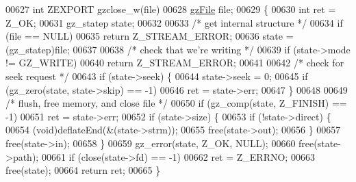 \begin{DoxyCode}
00627 \textcolor{keywordtype}{int} ZEXPORT gzclose\_w(file)
00628     \hyperlink{structgz_file__s}{gzFile} file;
00629 \{
00630     \textcolor{keywordtype}{int} ret = Z\_OK;
00631     gz\_statep state;
00632 
00633     \textcolor{comment}{/* get internal structure */}
00634     \textcolor{keywordflow}{if} (file == NULL)
00635         \textcolor{keywordflow}{return} Z\_STREAM\_ERROR;
00636     state = (gz\_statep)file;
00637 
00638     \textcolor{comment}{/* check that we're writing */}
00639     \textcolor{keywordflow}{if} (state->mode != GZ\_WRITE)
00640         \textcolor{keywordflow}{return} Z\_STREAM\_ERROR;
00641 
00642     \textcolor{comment}{/* check for seek request */}
00643     \textcolor{keywordflow}{if} (state->seek) \{
00644         state->seek = 0;
00645         \textcolor{keywordflow}{if} (gz\_zero(state, state->skip) == -1)
00646             ret = state->err;
00647     \}
00648 
00649     \textcolor{comment}{/* flush, free memory, and close file */}
00650     \textcolor{keywordflow}{if} (gz\_comp(state, Z\_FINISH) == -1)
00651         ret = state->err;
00652     if (state->size) \{
00653         \textcolor{keywordflow}{if} (!state->direct) \{
00654             (void)deflateEnd(&(state->strm));
00655             free(state->out);
00656         \}
00657         free(state->in);
00658     \}
00659     gz\_error(state, Z\_OK, NULL);
00660     free(state->path);
00661     \textcolor{keywordflow}{if} (close(state->fd) == -1)
00662         ret = Z\_ERRNO;
00663     free(state);
00664     \textcolor{keywordflow}{return} ret;
00665 \}
\end{DoxyCode}
